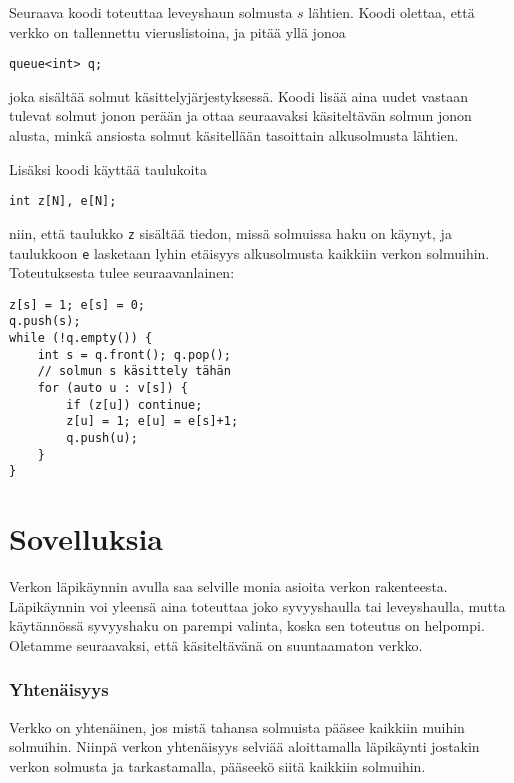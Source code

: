 Seuraava koodi toteuttaa leveyshaun
solmusta $s$ lähtien.
Koodi olettaa, että verkko on tallennettu
vieruslistoina, ja pitää yllä jonoa
\begin{lstlisting}
queue<int> q;
\end{lstlisting}
joka sisältää solmut käsittelyjärjestyksessä.
Koodi lisää aina uudet vastaan tulevat solmut
jonon perään ja ottaa seuraavaksi käsiteltävän
solmun jonon alusta,
minkä ansiosta solmut käsitellään tasoittain
alkusolmusta lähtien.

Lisäksi koodi käyttää taulukoita
\begin{lstlisting}
int z[N], e[N];
\end{lstlisting}
niin, että taulukko \texttt{z} sisältää tiedon,
missä solmuissa haku on käynyt,
ja taulukkoon \texttt{e} lasketaan lyhin
etäisyys alkusolmusta kaikkiin verkon solmuihin.
Toteutuksesta tulee seuraavanlainen:
\begin{lstlisting}
z[s] = 1; e[s] = 0;
q.push(s);
while (!q.empty()) {
    int s = q.front(); q.pop();
    // solmun s käsittely tähän     
    for (auto u : v[s]) {
        if (z[u]) continue;
        z[u] = 1; e[u] = e[s]+1;
        q.push(u);
    }
}
\end{lstlisting}

\section{Sovelluksia}

Verkon läpikäynnin avulla
saa selville monia asioita
verkon rakenteesta.
Läpikäynnin voi yleensä aina toteuttaa
joko syvyyshaulla tai leveyshaulla,
mutta käytännössä syvyyshaku on parempi valinta,
koska sen toteutus on helpompi.
Oletamme seuraavaksi, että käsiteltävänä on
suuntaamaton verkko.

\subsubsection{Yhtenäisyys}


Verkko on yhtenäinen,
jos mistä tahansa solmuista
pääsee kaikkiin muihin solmuihin.
Niinpä verkon yhtenäisyys selviää
aloittamalla läpikäynti
jostakin verkon solmusta ja
tarkastamalla, pääseekö siitä kaikkiin solmuihin.

